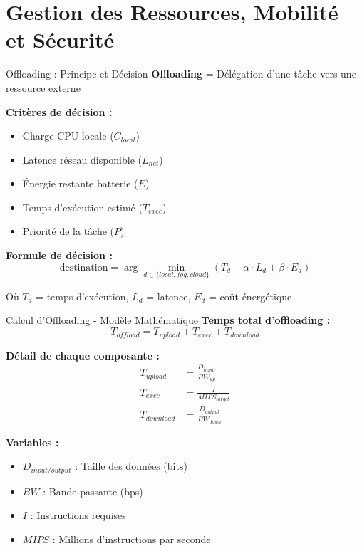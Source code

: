﻿\documentclass[aspectratio=169,11pt]{beamer}
\begin{document}
\section{Gestion des Ressources, Mobilit\'e et S\'ecurit\'e}

\begin{frame}{Offloading : Principe et D\'ecision}
\textbf{Offloading} = D\'el\'egation d'une t\^ache vers une ressource externe

\textbf{Crit\`eres de d\'ecision :}
\begin{itemize}
    \item Charge CPU locale ($C_{local}$)
    \item Latence r\'eseau disponible ($L_{net}$)
    \item \'Energie restante batterie ($E$)
    \item Temps d'ex\'ecution estim\'e ($T_{exec}$)
    \item Priorit\'e de la t\^ache ($P$)
\end{itemize}

\vspace{0.3cm}
\textbf{Formule de d\'ecision :}
\begin{equation}
\text{destination} = \arg\min_{d \in \{local, fog, cloud\}} \left( T_d + \alpha \cdot L_d + \beta \cdot E_d \right)
\end{equation}

O\`u $T_d$ = temps d'ex\'ecution, $L_d$ = latence, $E_d$ = co\^ut \'energ\'etique
\end{frame}

\begin{frame}{Calcul d'Offloading - Mod\`ele Math\'ematique}
\textbf{Temps total d'offloading :}
\begin{equation}
T_{offload} = T_{upload} + T_{exec} + T_{download}
\end{equation}

\textbf{D\'etail de chaque composante :}
\begin{align}
T_{upload} &= \frac{D_{input}}{BW_{up}} \\
T_{exec} &= \frac{I}{MIPS_{target}} \\
T_{download} &= \frac{D_{output}}{BW_{down}}
\end{align}

\textbf{Variables :}
\begin{itemize}
    \item $D_{input/output}$ : Taille des donn\'ees (bits)
    \item $BW$ : Bande passante (bps)
    \item $I$ : Instructions requises
    \item $MIPS$ : Millions d'instructions par seconde
\end{itemize}
\end{frame}
\end{document}

